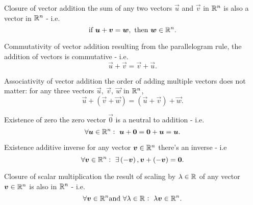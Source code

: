 \begin{descitemize}
    \item[Closure of vector addition] the sum of any two vectors $\vec{u}$ and $\vec{v}$ in $\Rs[n]$ is also a vector in $\Rs[n]$ - i.e. 
    \begin{equation}
        \text{if}\ \vec{u}+\vec{v}=\vec{w},\ \text{then}\ \vec{w}\in\Rs[n].
        \label{eq:vector_addition_closure}
    \end{equation}
    
    \item[Commutativity of vector addition] resulting from the parallelogram rule, the addition of vectors is commutative - i.e.
    \begin{equation}
        \vec{u}+\vec{v}=\vec{v}+\vec{u}.
        \label{eq:vector_addition_commutative_2}
    \end{equation}

    \item[Associativity of vector addition] the order of adding multiple vectors does not matter: for any three vectors $\vec{u},\ \vec{v},\ \vec{w}$ in $\Rs[n]$,
    \begin{equation}
        \vec{u}+\left(\vec{v}+\vec{w}\right) = \left(\vec{u}+\vec{v}\right)+\vec{w}.
        \label{eq:vector_addition_associative}
    \end{equation}
    
    \item[Existence of zero] the zero vector $\vec{0}$ is a neutral to addition - i.e.
    \begin{equation}
        \forall \vec{u}\in\Rs[n]:\ \vec{u}+\vec{0}=\vec{0}+\vec{u}=\vec{u}.
        \label{eq:vector_zero_existence}
    \end{equation}

    \item[Existence additive inverse] for any vector $\vec{v}\in\Rs[n]$ there's an inverse - i.e
    \begin{equation}
        \forall \vec{v}\in\Rs[n]:\ \exists\left(-\vec{v}\right), \vec{v}+\left(-\vec{v}\right) = \vec{0}.
        \label{eq:vector_zero_addition}
    \end{equation}

    \item[Closure of scalar multiplication] the result of scaling by $\lambda\in\Rs$ of any vector $\vec{v}\in\Rs[n]$ is also in $\Rs[n]$ - i.e. 
    \begin{equation}
        \forall\vec{v}\in\Rs[n] \text{and}\ \forall\lambda\in\Rs:\ \lambda\vec{v}\in\Rs[n].
        \label{eq:scalar_multiplication_closure}
    \end{equation}


\end{descitemize}
